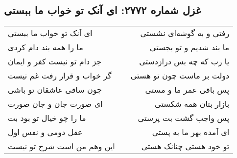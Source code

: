 \begin{center}
\section*{غزل شماره ۲۷۷۲: ای آنک تو خواب ما ببستی}
\label{sec:2772}
\begin{longtable}{l p{0.5cm} r}
ای آنک تو خواب ما ببستی
&&
رفتی و به گوشه‌ای نشستی
\\
ما را همه بند دام کردی
&&
ما بند شدیم و تو بجستی
\\
جز دام تو نیست کفر و ایمان
&&
یا رب که چه بس درازدستی
\\
گر خواب و قرار رفت غم نیست
&&
دولت بر ماست چون تو هستی
\\
چون ساقی عاشقان تو باشی
&&
پس باقی عمر ما و مستی
\\
ای صورت جان و جان صورت
&&
بازار بتان همه شکستی
\\
ما را چو خیال تو بود بت
&&
پس واجب گشت بت پرستی
\\
عقل دومی و نفس اول
&&
ای آمده بهر ما به پستی
\\
این وهم من است شرح تو نیست
&&
تو خود هستی چنانک هستی
\\
\end{longtable}
\end{center}
